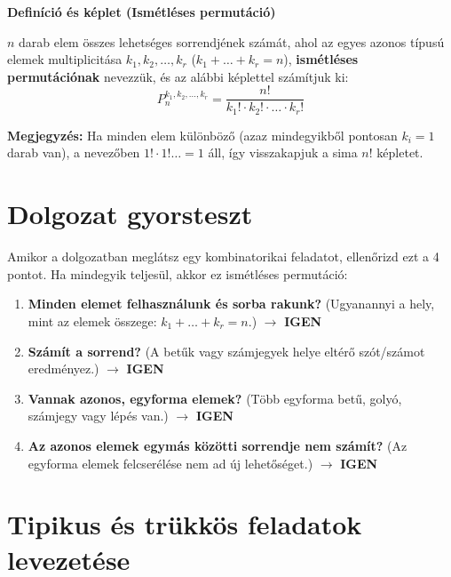 \documentclass[11pt, a4paper]{article}
\begin{document}
\vspace{0.2cm}
\noindent\textbf{Definíció és képlet (Ismétléses permutáció)}

$n$ darab elem összes lehetséges sorrendjének számát, ahol az egyes azonos típusú elemek multiplicitása $k_1, k_2, \ldots, k_r$ ($k_1 + \dots + k_r = n$), \textbf{ismétléses permutációnak} nevezzük, és az alábbi képlettel számítjuk ki:
\[
P_n^{k_1, k_2, \ldots, k_r} = \frac{n!}{k_1! \cdot k_2! \cdot \ldots \cdot k_r!}
\]

\vspace{0.2cm}
\noindent\textbf{Megjegyzés:} Ha minden elem különböző (azaz mindegyikből pontosan $k_i = 1$ darab van), a nevezőben $1! \cdot 1! \dots = 1$ áll, így visszakapjuk a sima $n!$ képletet.

\vspace{0.4cm}
\section{Dolgozat gyorsteszt}
Amikor a dolgozatban meglátsz egy kombinatorikai feladatot, ellenőrizd ezt a 4 pontot. Ha mindegyik teljesül, akkor ez ismétléses permutáció:
\begin{enumerate}
    \item \textbf{Minden elemet felhasználunk és sorba rakunk?} (Ugyanannyi a hely, mint az elemek összege: $k_1 + \dots + k_r = n$.) $\rightarrow$ \textbf{IGEN}
    \item \textbf{Számít a sorrend?} (A betűk vagy számjegyek helye eltérő szót/számot eredményez.) $\rightarrow$ \textbf{IGEN}
    \item \textbf{Vannak azonos, egyforma elemek?} (Több egyforma betű, golyó, számjegy vagy lépés van.) $\rightarrow$ \textbf{IGEN}
    \item \textbf{Az azonos elemek egymás közötti sorrendje nem számít?} (Az egyforma elemek felcserélése nem ad új lehetőséget.) $\rightarrow$ \textbf{IGEN}
\end{enumerate}
\vspace{0.5cm}

\section{Tipikus és trükkös feladatok levezetése}
\end{document}

